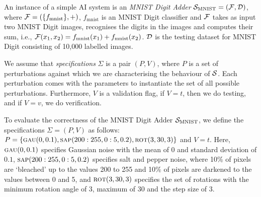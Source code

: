 \documentclass[10pt, conference, a4paper, final]{IEEEtran}
\begin{document}
\begin{example}
  \label{ex:mnist-adder}
  An instance of a simple AI system is an \emph{MNIST Digit Adder} $\S_{\text{MNIST}} = (\F,\D)$, where $\F = (\{f_{\text{mnist}}\}, +)$, $f_{\text{mnist}}$ is an MNIST Digit classifier and $\F$ takes as input two MNIST Digit images, recognises the digits in the images and computes their sum, i.e., $\F(x_1,x_2) = f_{\text{mnist}}(x_1) + f_{\text{mnist}}(x_2)$. $\D$ is the testing dataset for MNIST Digit consisting of 10,000 labelled images.
\end{example}

\smallskip

We assume that \emph{specifications} $\Sigma$ is a pair $(P, V)$,
where $P$ is a set of perturbations against which we are
characterising the behaviour of $\S$. Each perturbation comes with the
parameters to instantiate the set of all possible perturbations. 
%
Furthermore, $V$ is a validation flag, if $V=t$, then we do testing,
and if $V=v$, we do verification.

\begin{example}
  To evaluate the correctness of the MNIST Digit Adder
  $\S_{\text{MNIST}}$, we define the specifications $\Sigma = (P, V)$
  as follows:
  $P = \{\gaussian(0,0.1), \saltpepper(200:255, 0:5, 0.2),
  \rotation(3,30,3)\}$ and $V=t$. Here, $\gaussian(0,0.1)$ specifies
  Gaussian noise with the mean of $0$ and standard deviation of $0.1$,
  $\saltpepper(200:255,0:5,0.2)$ specifies salt and pepper noise,
  where 10\% of pixels are `bleached' up to the values 200 to 255 and
  10\% of pixels are darkened to the values between 0 and 5, and
  $\rotation(3,30,3)$
  specifies the set of rotations with the minimum rotation angle of 3,
  maximum of 30 and the step size of 3.
\end{example}
\end{document}

